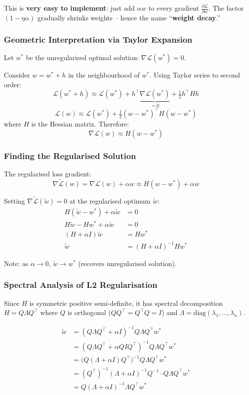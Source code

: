 \documentclass[12pt,a4paper]{article}
\newcommand{\Loss}{\mathcal{L}}
\begin{document}
This is \textbf{very easy to implement}: just add $\alpha w$ to every gradient $\frac{\partial\Loss}{\partial w}$. The factor $(1-\eta\alpha)$ gradually shrinks weights -- hence the name ``\textbf{weight decay}.''

\subsubsection{Geometric Interpretation via Taylor Expansion}

Let $w^*$ be the unregularised optimal solution: $\nabla\Loss(w^*) = 0$.

Consider $w = w^* + h$ in the neighbourhood of $w^*$. Using Taylor series to second order:
\[
\Loss(w^* + h) \approx \Loss(w^*)
  + h^\top \underbrace{\nabla\Loss(w^*)}_{=0}
  + \tfrac{1}{2}h^\top H h
\]
\[
\Loss(w) \approx \Loss(w^*) + \tfrac{1}{2}(w-w^*)^\top H (w-w^*)
\]
where $H$ is the Hessian matrix. Therefore:
\[
\boxed{\nabla\Loss(w) \approx H(w - w^*)}
\]

\subsubsection{Finding the Regularised Solution}

The regularised loss gradient:
\[
\nabla\tilde{\Loss}(w) = \nabla\Loss(w) + \alpha w \approx H(w-w^*) + \alpha w
\]

Setting $\nabla\tilde{\Loss}(\tilde{w}) = 0$ at the regularised optimum $\tilde{w}$:
\begin{align*}
H(\tilde{w} - w^*) + \alpha\tilde{w} &= 0\\
H\tilde{w} - Hw^* + \alpha\tilde{w} &= 0\\
(H + \alpha I)\tilde{w} &= Hw^*\\
\tilde{w} &= (H + \alpha I)^{-1}Hw^*
\end{align*}

Note: as $\alpha \to 0$, $\tilde{w} \to w^*$ (recovers unregularised solution).

\subsubsection{Spectral Analysis of L2 Regularisation}

Since $H$ is symmetric positive semi-definite, it has spectral decomposition $H = Q\Lambda Q^\top$ where $Q$ is orthogonal ($QQ^\top = Q^\top Q = I$) and $\Lambda = \mathrm{diag}(\lambda_1, \ldots, \lambda_n)$.

\begin{align*}
\tilde{w}
&= (Q\Lambda Q^\top + \alpha I)^{-1}Q\Lambda Q^\top w^*\\
&= (Q\Lambda Q^\top + \alpha QIQ^\top)^{-1}Q\Lambda Q^\top w^*\\
&= \bigl(Q(\Lambda + \alpha I)Q^\top\bigr)^{-1}Q\Lambda Q^\top w^*\\
&= (Q^\top)^{-1}(\Lambda + \alpha I)^{-1}Q^{-1} \cdot Q\Lambda Q^\top w^*\\
&= Q(\Lambda + \alpha I)^{-1}\Lambda Q^\top w^*
\end{align*}
\end{document}
